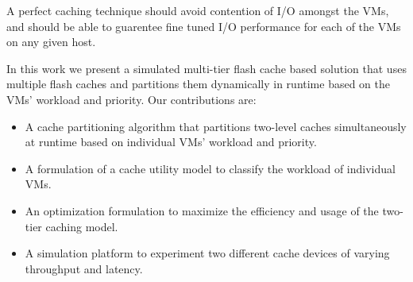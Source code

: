 A perfect caching technique should avoid contention of I/O amongst the VMs, and should be able to guarentee fine tuned I/O performance for each of the VMs on any given host.

In this work we present a simulated multi-tier flash cache based solution that uses multiple flash caches and partitions them dynamically in runtime based on the VMs' workload and priority. Our contributions are:
\begin{itemize}
\item A cache partitioning algorithm that partitions two-level caches simultaneously at runtime based on individual VMs' workload and priority.
\item A formulation of a cache utility model to classify the workload of individual VMs.
\item An optimization formulation to maximize the efficiency and usage of the two-tier caching model.
\item A simulation platform to experiment two different cache devices of varying throughput and latency.
\end{itemize}
